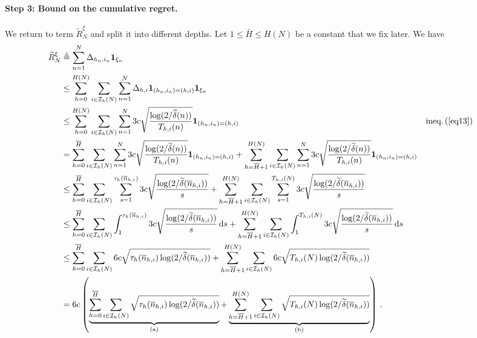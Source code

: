 \paragraph{Step 3: Bound on the cumulative regret.}
We return to  term $\tilde{R}_N^{\xi}$ and split it into different depths. Let $1\leq \bar{H} \leq H(N)$ be a constant that we  fix later. We have
\begingroup
\allowdisplaybreaks
\begin{align*}
    \widetilde{R}_N^{\xi} &\triangleq \sum_{n=1}^N \Delta_{h_n,i_n} {\bf 1}_{\xi_n} \\
                              &\leq \sum_{h=0}^{H(N)}\sum_{i\in\mathcal{I}_h(N)}\sum_{n=1}^N \Delta_{h,i} {\bf 1}_{(h_n,i_n)=(h,i)} {\bf 1}_{\xi_n} \\
                              &\leq \sum_{h=0}^{H(N)}\sum_{i\in\mathcal{I}_h(N)}\sum_{n=1}^N 3c\sqrt{\frac{\log(2/\widetilde{\delta}(n))}{T_{h,i}(n)}} {\bf 1}_{(h_n,i_n)=(h,i)} && \text{ineq.\,(\ref{eq13})} \\
                              &= \sum_{h=0}^{\overline{H}}\sum_{i\in\mathcal{I}_h(N)}\sum_{n=1}^N 3c\sqrt{\frac{\log(2/\widetilde{\delta}(n))}{T_{h,i}(n)}} {\bf 1}_{(h_n,i_n)=(h,i)} + \sum_{h=\overline{H}+1}^{H(N)}\sum_{i\in\mathcal{I}_h(N)}\sum_{n=1}^N 3c\sqrt{\frac{\log(2/\widetilde{\delta}(n))}{T_{h,i}(n)}} {\bf 1}_{(h_n,i_n)=(h,i)} \\
                              &\leq \sum_{h=0}^{\overline{H}}\sum_{i\in\mathcal{I}_h(N)}\sum_{s=1}^{\tau_h(\overline{n}_{h,i})} 3c\sqrt{\frac{\log(2/\widetilde{\delta}(\overline{n}_{h,i}))}{s}} + \sum_{h=\overline{H}+1}^{H(N)}\sum_{i\in\mathcal{I}_h(N)}\sum_{s=1}^{T_{h,i}(N)} 3c\sqrt{\frac{\log(2/\widetilde{\delta}(\overline{n}_{h,i}))}{s}} \\
                              &\leq \sum_{h=0}^{\overline{H}}\sum_{i\in\mathcal{I}_h(N)}\int_{1}^{\tau_h(\overline{n}_{h,i})} 3c\sqrt{\frac{\log(2/\widetilde{\delta}(\overline{n}_{h,i}))}{s}} \, \mathrm{d}s + \sum_{h=\overline{H}+1}^{H(N)}\sum_{i\in\mathcal{I}_h(N)}\int_{1}^{T_{h,i}(N)} 3c\sqrt{\frac{\log(2/\widetilde{\delta}(\overline{n}_{h,i}))}{s}} \, \mathrm{d}s \\
                              &\leq \sum_{h=0}^{\overline{H}}\sum_{i\in\mathcal{I}_h(N)} 6c\sqrt{\tau_h(\overline{n}_{h,i})\log(2/\widetilde{\delta}(\overline{n}_{h,i}))} + \sum_{h=\overline{H}+1}^{H(N)}\sum_{i\in\mathcal{I}_h(N)} 6c\sqrt{T_{h,i}(N)\log(2/\widetilde{\delta}(\overline{n}_{h,i}))} \\
                              &= 6c\left(\underbrace{\sum_{h=0}^{\overline{H}}\sum_{i\in\mathcal{I}_h(N)} \sqrt{\tau_h(\overline{n}_{h,i})\log(2/\widetilde{\delta}(\overline{n}_{h,i}))}}_\text{(a)} + \underbrace{\sum_{h=\overline{H}+1}^{H(N)}\sum_{i\in\mathcal{I}_h(N)} \sqrt{T_{h,i}(N)\log(2/\widetilde{\delta}(\overline{n}_{h,i}))}}_\text{(b)}\right)\,.
\end{align*}
